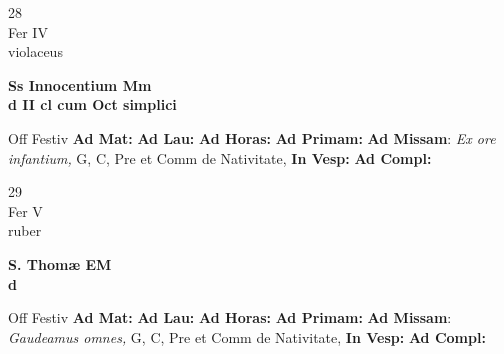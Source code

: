 \documentclass[10pt, openany]{book}
\begin{document}
        \begin{center}
            \begin{minipage}{3.5in}
                \vspace{2em}
                \begin{minipage}{0.5in}
                    {\Huge 28} \\
                    {\normalsize Fer IV} \\
                    {\normalsize violaceus}
                \end{minipage}
                \begin{minipage}{3.0in}
                    \textbf{ \large Ss Innocentium Mm \\
                    \textnormal{\normalsize d II cl cum Oct simplici}} \\ 
                \end{minipage}
                \begin{justify}Off Festiv
                    \textbf{Ad Mat: }
                    \textbf{Ad Lau: }
                    \textbf{Ad Horas: }
                    \textbf{Ad Primam: }\textbf{Ad Missam}: \textit{Ex ore infantium,} G, C, Pre et Comm de Nativitate,  
                    \textbf{In Vesp: }
                    \textbf{Ad Compl: }
                \end{justify}
            \end{minipage}
        \end{center}
    
        \begin{center}
            \begin{minipage}{3.5in}
                \vspace{2em}
                \begin{minipage}{0.5in}
                    {\Huge 29} \\
                    {\normalsize Fer V} \\
                    {\normalsize ruber}
                \end{minipage}
                \begin{minipage}{3.0in}
                    \textbf{ \large S. Thomæ EM \\
                    \textnormal{\normalsize d}} \\ 
                \end{minipage}
                \begin{justify}Off Festiv
                    \textbf{Ad Mat: }
                    \textbf{Ad Lau: }
                    \textbf{Ad Horas: }
                    \textbf{Ad Primam: }\textbf{Ad Missam}: \textit{Gaudeamus omnes,} G, C, Pre et Comm de Nativitate,  
                    \textbf{In Vesp: }
                    \textbf{Ad Compl: }
                \end{justify}
            \end{minipage}
        \end{center}
    
\end{document}
